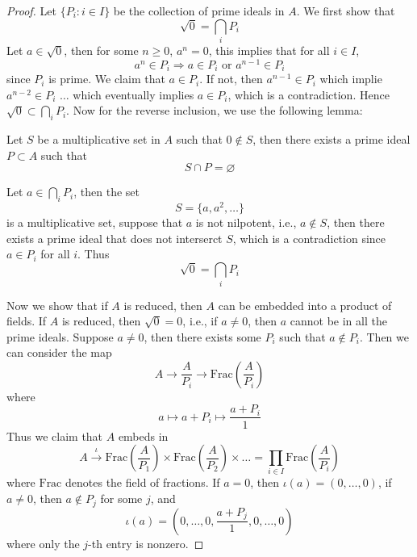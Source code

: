 \documentclass[openany]{book}
\let\emptyset\varnothing
\begin{document}
\begin{proof}
    Let $\{P_i:i\in I\}$ be the collection of prime ideals in $A$. We first show that 
    \begin{equation*}
        \sqrt{0}=\bigcap_{i}P_i
    \end{equation*}
    Let $a\in\sqrt{0}$, then for some $n\geq 0$, $a^n=0$, this implies that for all $i\in I$,
    \begin{equation*}
        a^n\in P_i\Rightarrow a\in P_i \text{ or } a^{n-1}\in P_i
    \end{equation*}
    since $P_i$ is prime. We claim that $a\in P_i$. If not, then $a^{n-1}\in P_i$ which implie $a^{n-2}\in P_i$ $\dots$ which eventually implies $a\in P_i$, which is a contradiction. Hence $\sqrt{0}\subset \bigcap_iP_i$. Now for the reverse inclusion, we use the following lemma:
    \begin{lem}
        Let $S$ be a multiplicative set in $A$ such that $0\not\in S$, then there exists a prime ideal $P\subset A$ such that 
        \begin{equation*}
            S\cap P=\emptyset
        \end{equation*}
    \end{lem}
    Let $a\in\bigcap_iP_i$, then the set 
    \begin{equation*}
        S=\{a, a^2, \dots\}
    \end{equation*}
    is a multiplicative set, suppose that $a$ is not nilpotent, i.e., $a\not\in S$, then there exists a prime ideal that does not interserct $S$, which is a contradiction since $a\in P_i$ for all $i$. Thus 
    \begin{equation*}
        \sqrt{0}=\bigcap_iP_i
    \end{equation*}

    Now we show that if $A$ is reduced, then $A$ can be embedded into a product of fields. If $A$ is reduced, then $\sqrt{0}=0$, i.e., if $a\neq0$, then $a$ cannot be in all the prime ideals. Suppose $a\neq 0$, then there exists some $P_i$ such that $a\not\in P_i$. Then we can consider the map 
    \begin{equation*}
        A\to \frac{A}{P_i}\to\text{Frac}\left( \frac{A}{P_i}\right)
    \end{equation*}
    where 
    \begin{equation*}
        a\mapsto a+P_i\mapsto \frac{a+P_i}{1}
    \end{equation*}
    Thus we claim that $A$ embeds in 
    \begin{equation*}
        A\xrightarrow{\iota}\text{Frac}\left( \frac{A}{P_1}\right)\times \text{Frac}\left( \frac{A}{P_2}\right)\times\dots=\prod_{i\in I}\text{Frac}\left( \frac{A}{P_i}\right)
    \end{equation*}
    where $\text{Frac}$ denotes the field of fractions. If $a=0$, then $\iota(a)=(0,\dots, 0)$, if $a\neq 0$, then $a\not\in P_j$ for some $j$, and 
    \begin{equation*}
        \iota(a)=\left(0,\dots, 0, \frac{a+P_j}{1},0,\dots, 0\right)
    \end{equation*}
    where only the $j$-th entry is nonzero.
\end{proof}
\end{document}
